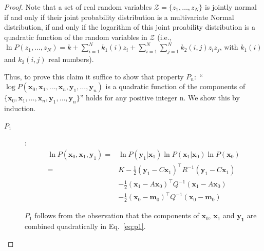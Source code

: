\documentclass[12pt]{article}
\begin{document}
\begin{proof}

    Note that a set of real random variables $\mathcal{Z}=\{z_1,\ldots,z_N\}$ is
    jointly normal if and only if their joint probability distribution is a
    multivariate Normal distribution, if and only if the logarithm of this
    joint proability distribution is a quadratic function of the random
    variables in $\mathcal{Z}$ (i.e., $\ln P(z_1,\ldots,z_N)=k+\sum_{i=1}^N
    k_1(i)z_i+\sum_{i=1}^N\sum_{j=1}^Nk_2(i,j)z_iz_j$, with $k_1(i)$ and
    $k_2(i,j)$ real numbers).

    Thus, to prove this claim it suffice to show that property $P_n$:\ ``$\log
    P(\mathbf{x}_0, \mathbf{x}_1, \ldots, \mathbf{x}_n, \mathbf{y}_1, \ldots,
    \mathbf{y}_n)$  is a quadratic function of the components of
    $\{\mathbf{x}_0, \mathbf{x}_1, \ldots, \mathbf{x}_n, \mathbf{y}_1, \ldots,
    \mathbf{y}_n\}$'' holds for any positive integer n. We show this by
    induction.

    \begin{description}
        \item[$P_1$]:
            \begin{align}
                \ln P(\mathbf{x}_0, \mathbf{x}_1, \mathbf{y}_1)=&\ln P(\mathbf{y}_1|\mathbf{x}_1)\ln P(\mathbf{x}_1|\mathbf{x}_0)\ln P(\mathbf{x}_0)\nonumber\\
                                                               =&K-\frac{1}{2}(\mathbf{y}_1-C\mathbf{x}_1)^\intercal R^{-1}(\mathbf{y}_1-C\mathbf{x}_1)\nonumber\\
                                                                &-\frac{1}{2}(\mathbf{x}_1-A\mathbf{x}_0)^\intercal Q^{-1}(\mathbf{x}_1-A\mathbf{x}_0)\nonumber\\
                                                                &-\frac{1}{2}(\mathbf{x}_0-\mathbf{m}_0)^\intercal Q^{-1}(\mathbf{x}_0-\mathbf{m}_0)\label{eq:p1}
            \end{align}

            $P_1$ follows from the observation that the components of
            $\mathbf{x}_0$, $\mathbf{x}_1$ and $\mathbf{y_1}$ are combined
            quadratically in Eq.~\ref{eq:p1}.


\end{description}
\end{proof}
\end{document}
